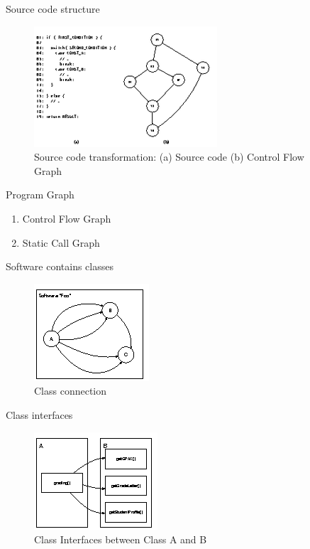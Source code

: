 \documentclass{beamer}
\begin{document}
\begin{frame}{Source code structure}
    \begin{figure}
        \includegraphics[height=.7\paperheight]{figure/cfg-transform}
        \caption{Source code transformation: (a) Source code (b) Control Flow Graph}
        \label{fig:sourceCodeTransf}
    \end{figure}
\end{frame}

\begin{frame}{Program Graph}
    \begin{enumerate}
        \item<1-> Control Flow Graph
        \item<2-> Static Call Graph
    \end{enumerate}
\end{frame}

\begin{frame}{Software contains classes}
    \begin{figure}
        \includegraphics[width=0.6\paperwidth]{figure/class-connected}
        \caption{Class connection}
        \label{fig:classConnect}
    \end{figure}
\end{frame}

\begin{frame}{Class interfaces}
    \begin{figure}
        \includegraphics[height=0.6\paperheight]{figure/class-interfaces}
        \caption{Class Interfaces between Class A and B}
        \label{fig:classInterfaces}
    \end{figure}
\end{frame}
\end{document}
